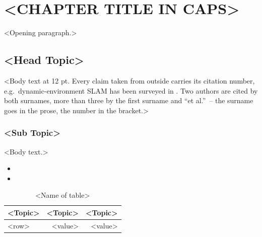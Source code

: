%

\chapter{<CHAPTER TITLE IN CAPS>}
\label{ch:<slug>}

<Opening paragraph.>

\section{<Head Topic>}
\label{sec:<slug>}

<Body text at 12 pt.  Every claim taken from outside carries its citation
number, e.g.\ dynamic-environment SLAM has been surveyed in \cite{saputra2018}.
Two authors are cited by both surnames, more than three by the first surname
and ``et al.''\ -- the surname goes in the prose, the number in the bracket.>

\subsection{<Sub Topic>}
\label{subsec:<slug>}

<Body text.>

\begin{itemize}
  \item[--] <sub content>
  \item[--] <sub content, continuation lines aligned under the first word>
\end{itemize}

\begin{table}[htbp]
  \caption{<Name of table>}
  \label{tab:<slug>}
  \centering
  \begin{tabular}{@{}lrr@{}}
    \toprule
    <Topic> & <Topic> & <Topic> \\
    \midrule
    <row> & <value> & <value> \\
    \bottomrule
  \end{tabular}
\end{table}

